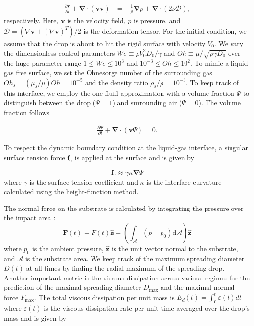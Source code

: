 \documentclass[reprint,amssymb,superscriptaddress,aps,prfluids,onecolumn]{revtex4-1}
\begin{document}
\begin{align}
	\label{Eqn::NS}
	\frac{\partial \boldsymbol{v}}{\partial t} + \boldsymbol{\nabla\cdot}\left(\boldsymbol{v}\boldsymbol{v}\right) &= -\frac{1}{\rho}\boldsymbol{\nabla} p + \boldsymbol{\nabla\cdot}\left(2\nu\boldsymbol{\mathcal{D}}\right),
\end{align}
respectively. Here, $\boldsymbol{v}$ is the velocity field, $p$ is pressure, and $\boldsymbol{\mathcal{D}} = (\nabla\boldsymbol{v} + (\nabla\boldsymbol{v})^T)/2$ is the deformation tensor. For the initial condition, we assume that the drop is about to hit the rigid surface with velocity $V_0$. 
We vary the dimensionless 
control parameters  
$
We \equiv \rho V_0^2D_0 / {\gamma} 
$
and $
Oh \equiv {\mu}/ \sqrt{\rho\gamma D_0}
$
over the huge parameter range $1\le We \le 10^3$ and $10^{-3}\le Oh \le 10^2$. To mimic a liquid-gas free surface, we set the Ohnesorge number of the surrounding gas $Oh_s = (\mu_s/\mu)Oh = 10^{-5}$ and the density ratio $\rho_s/\rho = 10^{-3}$.  
To keep track of this interface, we employ the one-fluid approximation \cite{prosperetti2009computational, tryggvason2011direct} with a volume fraction $\Psi$ to distinguish between the drop ($\Psi=1$) and surrounding air ($\Psi=0$). The volume fraction follows

\begin{align}
	\label{Eqn::Vof2}
	\frac{\partial \Psi}{\partial t} + \boldsymbol{\nabla \cdot}(\boldsymbol{v}\Psi) = 0.
\end{align}

To respect the dynamic boundary condition at the liquid-gas interface, a singular surface tension force $\boldsymbol{f}_\gamma$ is applied at the surface and is given by \cite{brackbill1992continuum}

\begin{equation}\label{Eqn::SurfaceTension}
	\boldsymbol{f}_\gamma \approx \gamma\kappa\boldsymbol{\nabla}\Psi
\end{equation}
where $\gamma$ is the surface tension coefficient and $\kappa$ is the interface curvature calculated using the height-function method. 

The normal force on the substrate is calculated by integrating the pressure over the impact area \cite{landau2013course}:
\begin{equation}
	\label{Eqn::force2}
	\boldsymbol{F}(t) = F(t) \hat{\boldsymbol{z}} = \left(\int_\mathcal{A} \left(p-p_0\right)\mathrm{d}\mathcal{A}\right)\hat{\boldsymbol{z}}
\end{equation}
\noindent where $p_0$ is the ambient pressure, $\hat{\boldsymbol{z}}$ is the unit vector normal to the substrate, and $\mathcal{A}$ is the substrate area. We 
keep track of the maximum spreading diameter $D(t)$ at all times by finding the radial maximum of the spreading drop. 
Another important metric is the viscous dissipation across various regimes for the prediction of the maximal spreading diameter $D_\text{max}$ and the maximal
normal force $F_\text{max}$. The total viscous dissipation per unit mass is $E_d(t) = \int_0^t \varepsilon(t)dt$ where $\varepsilon(t)$ is the viscous dissipation rate per unit time averaged over the drop's mass and is given by
\end{document}

